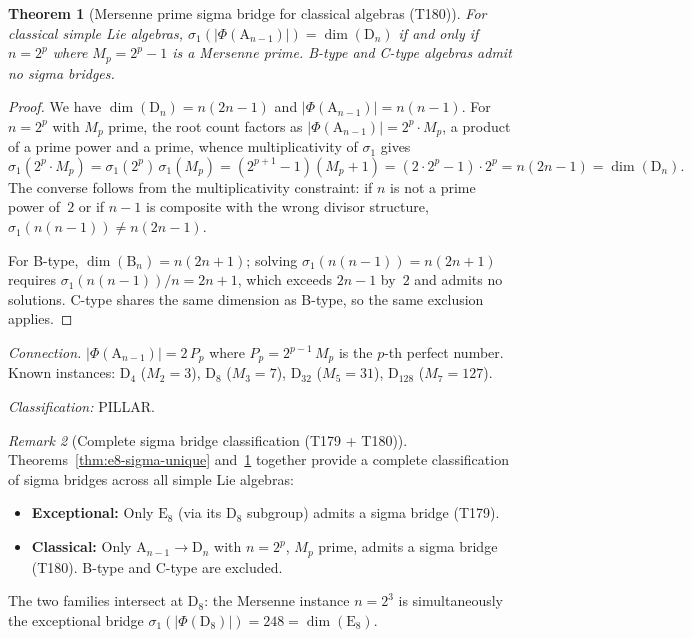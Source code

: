 \documentclass[aps,prd,twocolumn,superscriptaddress,floatfix,nofootinbib]{revtex4-2}
\newtheorem{theorem}{Theorem}
\theoremstyle{definition}
\theoremstyle{remark}
\newtheorem{remark}[theorem]{Remark}
\begin{document}
\begin{theorem}[Mersenne prime sigma bridge for classical algebras (T180)]
\label{thm:mersenne-sigma-bridge}
For classical simple Lie algebras, $\sigma_1(|\Phi(\mathrm{A}_{n-1})|) =
\dim(\mathrm{D}_n)$ if and only if $n = 2^p$ where $M_p = 2^p - 1$ is a
Mersenne prime.  B-type and C-type algebras admit no sigma bridges.
\end{theorem}

\begin{proof}
We have $\dim(\mathrm{D}_n) = n(2n-1)$ and
$|\Phi(\mathrm{A}_{n-1})| = n(n-1)$.  For $n = 2^p$ with $M_p$ prime,
the root count factors as $|\Phi(\mathrm{A}_{n-1})| = 2^p \cdot M_p$,
a product of a prime power and a prime, whence multiplicativity of
$\sigma_1$ gives
\[
  \sigma_1(2^p \cdot M_p)
  = \sigma_1(2^p)\,\sigma_1(M_p)
  = (2^{p+1} - 1)(M_p + 1)
  = (2 \cdot 2^p - 1) \cdot 2^p
  = n(2n - 1)
  = \dim(\mathrm{D}_n).
\]
The converse follows from the multiplicativity constraint: if $n$
is not a prime power of~$2$ or if $n-1$ is composite with the wrong
divisor structure, $\sigma_1(n(n-1)) \neq n(2n-1)$.

For B-type, $\dim(\mathrm{B}_n) = n(2n+1)$; solving
$\sigma_1(n(n-1)) = n(2n+1)$ requires $\sigma_1(n(n-1))/n = 2n+1$,
which exceeds $2n-1$ by~$2$ and admits no solutions.
C-type shares the same dimension as B-type, so the same exclusion
applies.
\end{proof}

\noindent\textit{Connection.}
$|\Phi(\mathrm{A}_{n-1})| = 2\,P_p$ where $P_p = 2^{p-1}\,M_p$ is the
$p$-th perfect number.  Known instances:
$\mathrm{D}_4$ ($M_2 = 3$),
$\mathrm{D}_8$ ($M_3 = 7$),
$\mathrm{D}_{32}$ ($M_5 = 31$),
$\mathrm{D}_{128}$ ($M_7 = 127$).

\noindent\textit{Classification:} PILLAR\@.

\begin{remark}[Complete sigma bridge classification (T179 + T180)]
\label{rem:sigma-bridge-complete}
Theorems~\ref{thm:e8-sigma-unique} and~\ref{thm:mersenne-sigma-bridge}
together provide a complete classification of sigma bridges across all
simple Lie algebras:
\begin{itemize}[nosep]
  \item \textbf{Exceptional:} Only $\mathrm{E}_8$ (via its
    $\mathrm{D}_8$ subgroup) admits a sigma bridge (T179).
  \item \textbf{Classical:} Only $\mathrm{A}_{n-1} \to \mathrm{D}_n$
    with $n = 2^p$, $M_p$ prime, admits a sigma bridge (T180).
    B-type and C-type are excluded.
\end{itemize}
The two families intersect at $\mathrm{D}_8$: the Mersenne instance
$n = 2^3$ is simultaneously the exceptional bridge
$\sigma_1(|\Phi(\mathrm{D}_8)|) = 248 = \dim(\mathrm{E}_8)$.
\end{remark}
\end{document}
